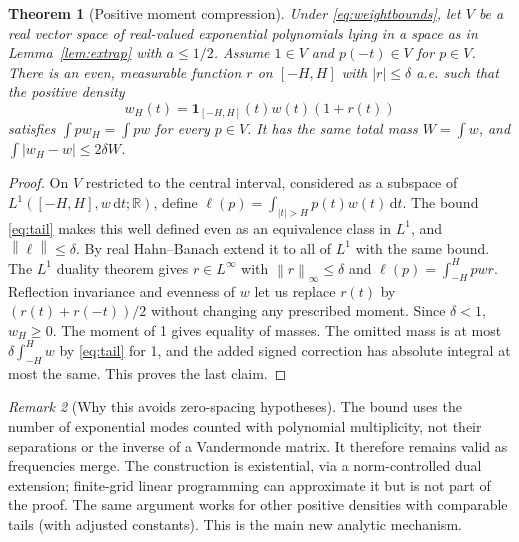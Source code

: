 \documentclass[11pt]{article}
\newtheorem{theorem}{Theorem}[section]
\theoremstyle{remark}\newtheorem{remark}[theorem]{Remark}
\newcommand{\R}{\mathbb R}\newcommand{\C}{\mathbb C}\newcommand{\e}{\mathrm e}\newcommand{\ii}{\mathrm i}\newcommand{\dd}{\,\mathrm d}\newcommand{\abs}[1]{\left|#1\right|}\newcommand{\norm}[1]{\left\|#1\right\|}\newcommand{\ord}{\operatorname{ord}}\newcommand{\re}{\operatorname{Re}}\newcommand{\im}{\operatorname{Im}}\newcommand{\supp}{\operatorname{supp}}
\begin{document}
\begin{theorem}[Positive moment compression]\label{thm:compress}
Under \eqref{eq:weightbounds}, let $V$ be a real vector space of real-valued exponential polynomials lying in a space as in Lemma~\ref{lem:extrap} with $a\le1/2$. Assume $1\in V$ and $p(-t)\in V$ for $p\in V$. There is an even, measurable function $r$ on $[-H,H]$ with $|r|\le\delta$ a.e. such that the positive density
\[
w_H(t)=\mathbf1_{[-H,H]}(t)w(t)(1+r(t))
\]
satisfies $\int p w_H=\int p w$ for every $p\in V$. It has the same total mass $W=\int w$, and $\int |w_H-w|\le 2\delta W$.
\end{theorem}
\begin{proof}
On $V$ restricted to the central interval, considered as a subspace of $L^1([-H,H],w\dd t;\R)$, define $\ell(p)=\int_{|t|>H}p(t)w(t)\dd t$. The bound \eqref{eq:tail} makes this well defined even as an equivalence class in $L^1$, and $\norm{\ell}\le\delta$. By real Hahn--Banach extend it to all of $L^1$ with the same bound. The $L^1$ duality theorem gives $r\in L^\infty$ with $\norm r_\infty\le\delta$ and $\ell(p)=\int_{-H}^H pwr$. Reflection invariance and evenness of $w$ let us replace $r(t)$ by $(r(t)+r(-t))/2$ without changing any prescribed moment. Since $\delta<1$, $w_H\ge0$. The moment of 1 gives equality of masses. The omitted mass is at most $\delta\int_{-H}^H w$ by \eqref{eq:tail} for 1, and the added signed correction has absolute integral at most the same. This proves the last claim.
\end{proof}

\begin{remark}[Why this avoids zero-spacing hypotheses]
The bound uses the number of exponential modes counted with polynomial multiplicity, not their separations or the inverse of a Vandermonde matrix. It therefore remains valid as frequencies merge. The construction is existential, via a norm-controlled dual extension; finite-grid linear programming can approximate it but is not part of the proof. The same argument works for other positive densities with comparable tails (with adjusted constants). This is the main new analytic mechanism.
\end{remark}
\end{document}
